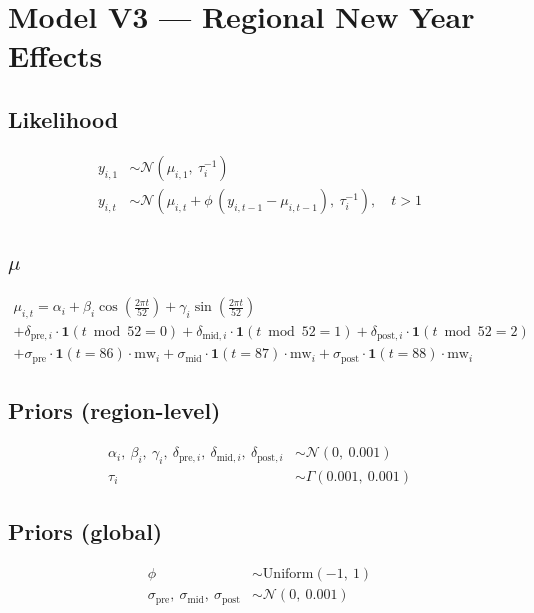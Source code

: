 \documentclass{article}
\begin{document}
\section*{Model V3 --- Regional New Year Effects}

\subsection*{Likelihood}

\begin{align}
  y_{i,1} &\sim \mathcal{N}(\mu_{i,1},\ \tau_i^{-1}) \\[6pt]
  y_{i,t} &\sim \mathcal{N}\left(\mu_{i,t} + \phi\,(y_{i,t-1} - \mu_{i,t-1}),\ \tau_i^{-1}\right), \quad t > 1
\end{align}

\subsection*{$\mu$}

\begin{multline}
  \mu_{i,t} = \alpha_i
    + \beta_i \cos\left(\tfrac{2\pi t}{52}\right)
    + \gamma_i \sin\left(\tfrac{2\pi t}{52}\right) \\
    + \delta_{\text{pre},i} \cdot \mathbf{1}(t \bmod 52 = 0)
    + \delta_{\text{mid},i} \cdot \mathbf{1}(t \bmod 52 = 1)
    + \delta_{\text{post},i} \cdot \mathbf{1}(t \bmod 52 = 2) \\
    + \sigma_{\text{pre}} \cdot \mathbf{1}(t = 86) \cdot \mathrm{mw}_i
    + \sigma_{\text{mid}} \cdot \mathbf{1}(t = 87) \cdot \mathrm{mw}_i
    + \sigma_{\text{post}} \cdot \mathbf{1}(t = 88) \cdot \mathrm{mw}_i
\end{multline}

\subsection*{Priors (region-level)}

\begin{align}
  \alpha_i,\ \beta_i,\ \gamma_i,\ \delta_{\text{pre},i},\ \delta_{\text{mid},i},\ \delta_{\text{post},i} &\sim \mathcal{N}(0,\ 0.001) \\
  \tau_i &\sim \Gamma(0.001,\ 0.001)
\end{align}

\subsection*{Priors (global)}

\begin{align}
  \phi &\sim \mathrm{Uniform}(-1,\ 1) \\
  \sigma_{\text{pre}},\ \sigma_{\text{mid}},\ \sigma_{\text{post}} &\sim \mathcal{N}(0,\ 0.001)
\end{align}
\end{document}
